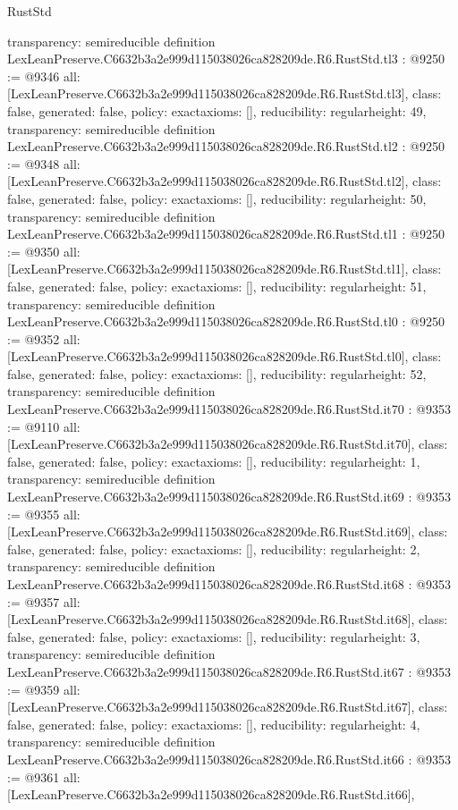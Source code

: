 \begin{lexlean}{RustStd}
\begin{coremodule}
{  transparency: semireducible
}
definition LexLeanPreserve.C6632b3a2e999d115038026ca828209de.R6.RustStd.tl3 : @9250 := @9346 {
  all: [LexLeanPreserve.C6632b3a2e999d115038026ca828209de.R6.RustStd.tl3],
  class: false,
  generated: false,
  policy: exact{axioms: []},
  reducibility: regular{height: 49},
  transparency: semireducible
}
definition LexLeanPreserve.C6632b3a2e999d115038026ca828209de.R6.RustStd.tl2 : @9250 := @9348 {
  all: [LexLeanPreserve.C6632b3a2e999d115038026ca828209de.R6.RustStd.tl2],
  class: false,
  generated: false,
  policy: exact{axioms: []},
  reducibility: regular{height: 50},
  transparency: semireducible
}
definition LexLeanPreserve.C6632b3a2e999d115038026ca828209de.R6.RustStd.tl1 : @9250 := @9350 {
  all: [LexLeanPreserve.C6632b3a2e999d115038026ca828209de.R6.RustStd.tl1],
  class: false,
  generated: false,
  policy: exact{axioms: []},
  reducibility: regular{height: 51},
  transparency: semireducible
}
definition LexLeanPreserve.C6632b3a2e999d115038026ca828209de.R6.RustStd.tl0 : @9250 := @9352 {
  all: [LexLeanPreserve.C6632b3a2e999d115038026ca828209de.R6.RustStd.tl0],
  class: false,
  generated: false,
  policy: exact{axioms: []},
  reducibility: regular{height: 52},
  transparency: semireducible
}
definition LexLeanPreserve.C6632b3a2e999d115038026ca828209de.R6.RustStd.it70 : @9353 := @9110 {
  all: [LexLeanPreserve.C6632b3a2e999d115038026ca828209de.R6.RustStd.it70],
  class: false,
  generated: false,
  policy: exact{axioms: []},
  reducibility: regular{height: 1},
  transparency: semireducible
}
definition LexLeanPreserve.C6632b3a2e999d115038026ca828209de.R6.RustStd.it69 : @9353 := @9355 {
  all: [LexLeanPreserve.C6632b3a2e999d115038026ca828209de.R6.RustStd.it69],
  class: false,
  generated: false,
  policy: exact{axioms: []},
  reducibility: regular{height: 2},
  transparency: semireducible
}
definition LexLeanPreserve.C6632b3a2e999d115038026ca828209de.R6.RustStd.it68 : @9353 := @9357 {
  all: [LexLeanPreserve.C6632b3a2e999d115038026ca828209de.R6.RustStd.it68],
  class: false,
  generated: false,
  policy: exact{axioms: []},
  reducibility: regular{height: 3},
  transparency: semireducible
}
definition LexLeanPreserve.C6632b3a2e999d115038026ca828209de.R6.RustStd.it67 : @9353 := @9359 {
  all: [LexLeanPreserve.C6632b3a2e999d115038026ca828209de.R6.RustStd.it67],
  class: false,
  generated: false,
  policy: exact{axioms: []},
  reducibility: regular{height: 4},
  transparency: semireducible
}
definition LexLeanPreserve.C6632b3a2e999d115038026ca828209de.R6.RustStd.it66 : @9353 := @9361 {
  all: [LexLeanPreserve.C6632b3a2e999d115038026ca828209de.R6.RustStd.it66],
}
\end{coremodule}
\end{lexlean}
